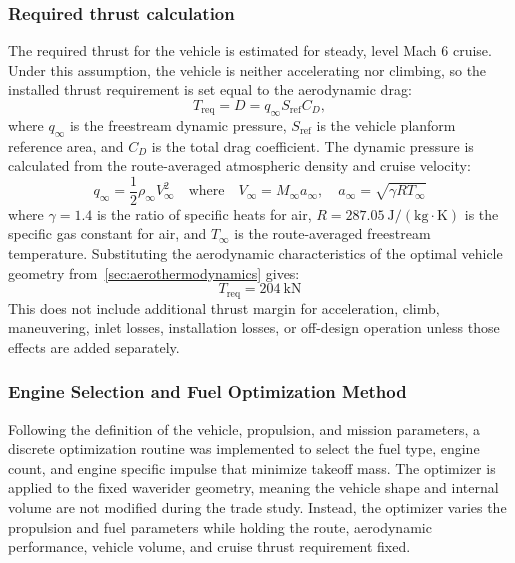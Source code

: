 \documentclass[10pt,a4paper]{article}
\begin{document}
\subsubsection{Required thrust calculation}
The required thrust for the vehicle is estimated for steady, level Mach 6 cruise. Under this assumption, the vehicle is neither accelerating nor climbing, so the installed thrust requirement is set equal to the aerodynamic drag:
\begin{equation}
    T_{\mathrm{req}} = D = q_{\infty} S_{\mathrm{ref}} C_D,
\end{equation}
where \(q_{\infty}\) is the freestream dynamic pressure, \(S_{\mathrm{ref}}\) is the vehicle planform reference area, and \(C_D\) is the total drag coefficient. The dynamic pressure is calculated from the route-averaged atmospheric density and cruise velocity:
\begin{equation}
    q_{\infty} = \frac{1}{2} \rho_{\infty} V_{\infty}^2
    \quad\text{where}\quad
    V_{\infty} = M_{\infty} a_{\infty},\quad
    a_{\infty} = \sqrt{\gamma R T_{\infty}}
\end{equation}
where \(\gamma = 1.4\) is the ratio of specific heats for air, \(R = 287.05~\mathrm{J/(kg \cdot K)}\) is the specific gas constant for air, and \(T_{\infty}\) is the route-averaged freestream temperature. Substituting the aerodynamic characteristics of the optimal vehicle geometry from~\cref{sec:aerothermodynamics} gives:
\begin{equation}
    \boxed{T_{\mathrm{req}} = 204~\mathrm{kN}}
\end{equation}
This does not include additional thrust margin for acceleration, climb, maneuvering, inlet losses, installation losses, or off-design operation unless those effects are added separately.

\subsubsection{Engine Selection and Fuel Optimization Method}
\label{sec:range}
Following the definition of the vehicle, propulsion, and mission parameters, a discrete optimization routine was implemented to select the fuel type, engine count, and engine specific impulse that minimize takeoff mass. The optimizer is applied to the fixed waverider geometry, meaning the vehicle shape and internal volume are not modified during the trade study. Instead, the optimizer varies the propulsion and fuel parameters while holding the route, aerodynamic performance, vehicle volume, and cruise thrust requirement fixed.
\end{document}
